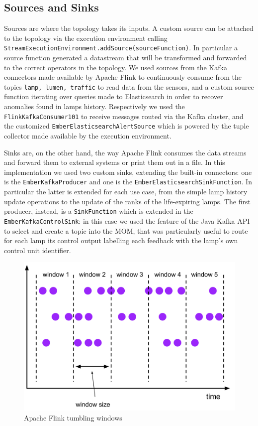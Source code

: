 \subsection{Sources and Sinks}
Sources are where the topology takes its inputs. A custom source can be attached to the topology via the execution environment calling \texttt{StreamExecutionEnvironment.addSource(sourceFunction)}. In particular a source function generated a datastream that will be transformed and forwarded to the correct operators in the topology. We used sources from the Kafka connectors made available by Apache Flink to continuously consume from the topics \texttt{lamp, lumen, traffic} to read data from the sensors, and a custom source function iterating over queries made to Elasticsearch in order to recover anomalies found in lamps history. Respectively we used the \texttt{FlinkKafkaConsumer101} to receive messages routed via the Kafka cluster, and the customized \texttt{EmberElasticsearchAlertSource} which is powered by the tuple collector made available by the execution environment.

Sinks are, on the other hand, the way Apache Flink consumes the data streams and forward them to external systems or print them out in a file. In this implementation we used two custom sinks, extending the built-in connectors: one is the \texttt{EmberKafkaProducer} and one is the \texttt{EmberElasticsearchSinkFunction}. In particular the latter is extended for each use case, from the simple lamp history update operations to the update of the ranks of the life-expiring lamps. The first producer, instead, is a \texttt{SinkFunction} which is extended in the \texttt{EmberKafkaControlSink}: in this case we used the feature of the Java Kafka API to select and create a topic into the MOM, that was particularly useful to route for each lamp its control output labelling each feedback with the lamp's own control unit identifier.
\begin{figure}
\begin{center}
	\includegraphics[scale=0.25]{img/flink_windows}
	\caption{Apache Flink tumbling windows}
	\label{fig:flink_windows}
\end{center}
\end{figure}

